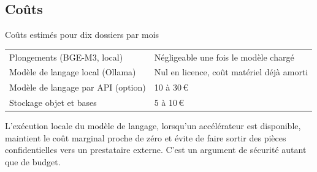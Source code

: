 \subsection{Coûts}

\begin{btptable}{Coûts estimés pour dix dossiers par mois}
\label{tab:couts}
\begin{tabularx}{\linewidth}{@{}L{5.2cm} Y@{}}
\toprule
{}
 &  \\
\midrule
Plongements (BGE-M3, local)     & Négligeable une fois le modèle chargé \\
Modèle de langage local (Ollama) & Nul en licence, coût matériel déjà amorti \\
Modèle de langage par API (option) & 10 à 30\,€ \\
Stockage objet et bases         & 5 à 10\,€ \\
\bottomrule
\end{tabularx}
\end{btptable}

L'exécution locale du modèle de langage, lorsqu'un accélérateur est
disponible, maintient le coût marginal proche de zéro et évite de faire
sortir des pièces confidentielles vers un prestataire externe. C'est un
argument de sécurité autant que de budget.
